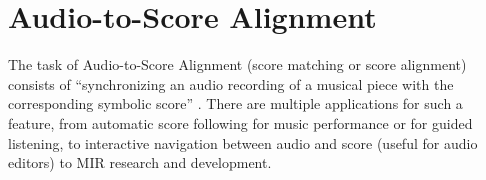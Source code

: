 

\section{Audio-to-Score Alignment}
The task of Audio-to-Score Alignment (score matching or score alignment) consists of ``synchronizing an audio recording of a musical piece with the corresponding symbolic score'' \cite{carabias-ortiAUDIOSCOREALIGNMENTa}. There are multiple applications for such a feature, from automatic score following for music performance or for guided listening, to interactive navigation between audio and score (useful for audio editors) to \ac{MIR} research and development.

